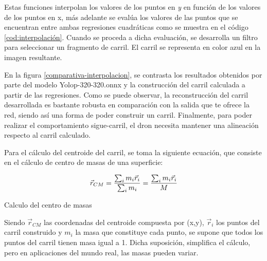 Estas funciones interpolan los valores de los puntos en \textit{y} en función de los valores de los puntos en x, 
más adelante se evalúa los valores de las puntos que se encuentran entre 
ambas regresiones cuadráticas como se muestra en el código \ref{cod:interpolación}. Cuando se proceda a dicha evaluación, se desarrolla un filtro 
para seleccionar un fragmento de carril. El carril se representa en color azul en la imagen resultante.\newline

En la figura \ref{comparativa-interpolacion}, se contrasta los resultados obtenidos por parte del modelo Yolop-320-320.onnx y la construcción del carril calculada a partir de las regresiones. 
Como se puede observar, la reconstrucción del carril desarrollada es bastante robusta en comparación con la salida que te ofrece la red, siendo así una forma de poder construir un 
carril. Finalmente, para poder realizar el comportamiento sigue-carril, el dron necesita mantener una alineación respecto al carril calculado. \newline

Para el cálculo del centroide del carril, se toma la siguiente ecuación, que consiste en el cálculo de centro de masas de una superficie: \newline
  \begin{myequation}[h]
    \begin{equation} 
      \vec{r}_{CM} = \frac{\sum_{i}m_{i} \vec{r}_{i}}{\sum_{i}m_{i}} = \frac{\sum_{i}m_{i} \vec{r}_{i}}{M} 
      \newline
      \label{eq:funcioncentromasas}
    \end{equation} 
    \caption{Calculo del centro de masas}
  \end{myequation}

  Siendo $\vec{r}_{CM}$ las coordenadas del centroide compuesta por (x,y), $\vec{r}_{i}$ los puntos del carril construido y $m_{i}$ la masa que constituye cada punto, se supone que todos 
  los puntos del carril tienen masa igual a 1. Dicha suposición, simplifica el cálculo, pero en aplicaciones del mundo real, las masas pueden variar. 


